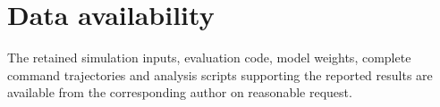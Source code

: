 \documentclass[11pt,a4paper]{article}
\begin{document}
\section*{Data availability}
The retained simulation inputs, evaluation code, model weights, complete command trajectories and analysis scripts supporting the reported results are available from the corresponding author on reasonable request.
\end{document}
